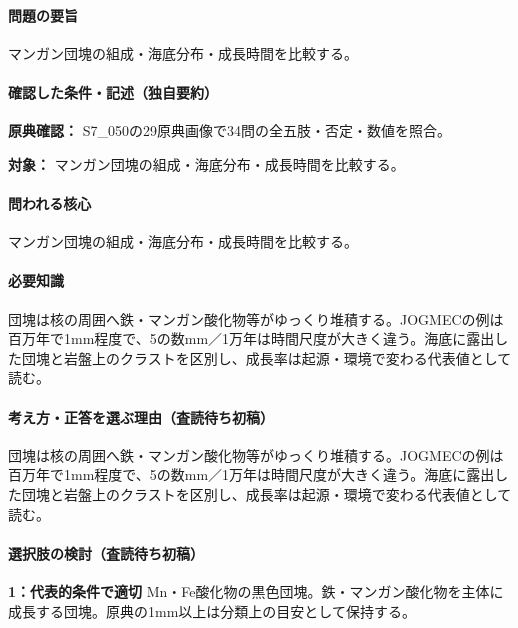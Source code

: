 \paragraph{問題の要旨} マンガン団塊の組成・海底分布・成長時間を比較する。

\paragraph{確認した条件・記述（独自要約）}\mbox{}\par

\noindent\textbf{原典確認：} S7\_050の29原典画像で34問の全五肢・否定・数値を照合。\par

\noindent\textbf{対象：} マンガン団塊の組成・海底分布・成長時間を比較する。\par

\paragraph{問われる核心} マンガン団塊の組成・海底分布・成長時間を比較する。

\paragraph{必要知識} 団塊は核の周囲へ鉄・マンガン酸化物等がゆっくり堆積する。JOGMECの例は百万年で1mm程度で、5の数mm／1万年は時間尺度が大きく違う。海底に露出した団塊と岩盤上のクラストを区別し、成長率は起源・環境で変わる代表値として読む。

\paragraph{考え方・正答を選ぶ理由（査読待ち初稿）} 団塊は核の周囲へ鉄・マンガン酸化物等がゆっくり堆積する。JOGMECの例は百万年で1mm程度で、5の数mm／1万年は時間尺度が大きく違う。海底に露出した団塊と岩盤上のクラストを区別し、成長率は起源・環境で変わる代表値として読む。

\paragraph{選択肢の検討（査読待ち初稿）}\mbox{}\par

\noindent\textbf{1：代表的条件で適切} Mn・Fe酸化物の黒色団塊。鉄・マンガン酸化物を主体に成長する団塊。原典の1mm以上は分類上の目安として保持する。\par


